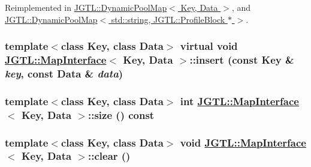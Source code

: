 Reimplemented in \hyperlink{class_j_g_t_l_1_1_dynamic_pool_map_28192d8477398c5a94b3ca80fc366076}{JGTL::Dynamic\-Pool\-Map$<$ Key, Data $>$}, and \hyperlink{class_j_g_t_l_1_1_dynamic_pool_map_28192d8477398c5a94b3ca80fc366076}{JGTL::Dynamic\-Pool\-Map$<$ std::string, JGTL::Profile\-Block $\ast$ $>$}.\hypertarget{class_j_g_t_l_1_1_map_interface_e416f8f15a065ea183c289932ef794c6}{
\subsubsection[insert]{\setlength{\rightskip}{0pt plus 5cm}template$<$class Key, class Data$>$ virtual void \hyperlink{class_j_g_t_l_1_1_map_interface}{JGTL::Map\-Interface}$<$ Key, Data $>$::insert (const Key \& {\em key}, const Data \& {\em data})}}
\label{class_j_g_t_l_1_1_map_interface_e416f8f15a065ea183c289932ef794c6}


\hypertarget{class_j_g_t_l_1_1_map_interface_416044d92d5c6d09ed79d13a775ba222}{
\subsubsection[size]{\setlength{\rightskip}{0pt plus 5cm}template$<$class Key, class Data$>$ int \hyperlink{class_j_g_t_l_1_1_map_interface}{JGTL::Map\-Interface}$<$ Key, Data $>$::size () const}}
\label{class_j_g_t_l_1_1_map_interface_416044d92d5c6d09ed79d13a775ba222}


\hypertarget{class_j_g_t_l_1_1_map_interface_af2d3667a3a9cf577177720e2b757d03}{
\subsubsection[clear]{\setlength{\rightskip}{0pt plus 5cm}template$<$class Key, class Data$>$ void \hyperlink{class_j_g_t_l_1_1_map_interface}{JGTL::Map\-Interface}$<$ Key, Data $>$::clear ()}}
\label{class_j_g_t_l_1_1_map_interface_af2d3667a3a9cf577177720e2b757d03}


